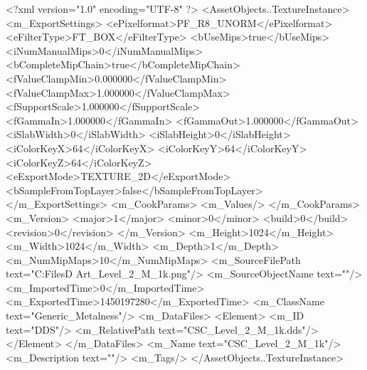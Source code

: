 <?xml version="1.0" encoding="UTF-8" ?>
<AssetObjects..TextureInstance>
	<m_ExportSettings>
		<ePixelformat>PF_R8_UNORM</ePixelformat>
		<eFilterType>FT_BOX</eFilterType>
		<bUseMips>true</bUseMips>
		<iNumManualMips>0</iNumManualMips>
		<bCompleteMipChain>true</bCompleteMipChain>
		<fValueClampMin>0.000000</fValueClampMin>
		<fValueClampMax>1.000000</fValueClampMax>
		<fSupportScale>1.000000</fSupportScale>
		<fGammaIn>1.000000</fGammaIn>
		<fGammaOut>1.000000</fGammaOut>
		<iSlabWidth>0</iSlabWidth>
		<iSlabHeight>0</iSlabHeight>
		<iColorKeyX>64</iColorKeyX>
		<iColorKeyY>64</iColorKeyY>
		<iColorKeyZ>64</iColorKeyZ>
		<eExportMode>TEXTURE_2D</eExportMode>
		<bSampleFromTopLayer>false</bSampleFromTopLayer>
	</m_ExportSettings>
	<m_CookParams>
		<m_Values/>
	</m_CookParams>
	<m_Version>
		<major>1</major>
		<minor>0</minor>
		<build>0</build>
		<revision>0</revision>
	</m_Version>
	<m_Height>1024</m_Height>
	<m_Width>1024</m_Width>
	<m_Depth>1</m_Depth>
	<m_NumMipMaps>10</m_NumMipMaps>
	<m_SourceFilePath text="C:\Users\Shadow\Desktop\Working Files\3D Art\CSC_Level_2_M_1k.png"/>
	<m_SourceObjectName text=""/>
	<m_ImportedTime>0</m_ImportedTime>
	<m_ExportedTime>1450197280</m_ExportedTime>
	<m_ClassName text="Generic_Metalness"/>
	<m_DataFiles>
		<Element>
			<m_ID text="DDS"/>
			<m_RelativePath text="CSC_Level_2_M_1k.dds"/>
		</Element>
	</m_DataFiles>
	<m_Name text="CSC_Level_2_M_1k"/>
	<m_Description text=""/>
	<m_Tags/>
</AssetObjects..TextureInstance>

